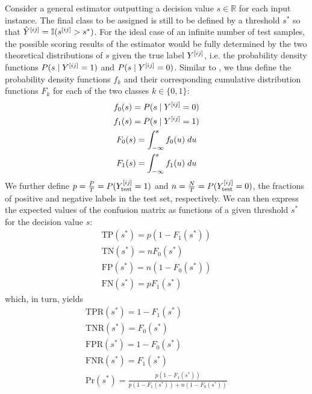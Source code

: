 Consider a general estimator outputting a decision value $s \in \mathbb{R}$ for each input instance. The final class to be assigned is still to be defined by a threshold $s^*$ so that $\hat Y^{[ij]} = \mathbb{I}(s^{[ij]} > s^*)$. For the ideal case of an infinite number of test samples, the possible scoring results of the estimator would be fully determined by the two theoretical distributions of $s$ given the true label $Y^{[ij]}$, i.e. the probability density functions $P(s \mid Y^{[ij]} = 1)$ and $P(s \mid Y^{[ij]} = 0)$. Similar to \textcite{hand2009measuring}, we thus define the probability density functions $f_k$ and their corresponding cumulative distribution functions $F_k$ for each of the two classes $k \in \{0, 1\}$:
%
\begin{gather}
    f_0(s) = P(s \mid Y^{[ij]} = 0) \\
    f_1(s) = P(s \mid Y^{[ij]} = 1) \\
    F_0(s) = \int_{-\infty}^s f_0(u)\;du \\
    F_1(s) = \int_{-\infty}^s f_1(u)\;du
    \label{eq:ideal_confusion_matrix}
\end{gather}
%
We further define $p=\frac{P}{T}=P(Y_\text{test}^{[ij]}=1)$ and $n=\frac{N}{T}=P(Y_\text{test}^{[ij]}=0)$, the fractions of positive and negative labels in the test set, respectively. We can then express the expected values of the confusion matrix as functions of a given threshold $s^*$ for the decision value $s$:
%
\begin{gather}
    \text{TP}(s^*) = p (1 - F_1(s^*)) \\
    \text{TN}(s^*) = n F_0(s^*) \\
    \text{FP}(s^*) = n (1 - F_0(s^*)) \\
    \text{FN}(s^*) = p F_1(s^*)
\end{gather}
%
which, in turn, yields
%
\begin{gather}
    \text{TPR}(s^*) = 1 - F_1(s^*) \\
    \text{TNR}(s^*) = F_0(s^*) \\
    \text{FPR}(s^*) = 1 - F_0(s^*) \\
    \text{FNR}(s^*) = F_1(s^*) \\
    \text{Pr}(s^*) = \frac{p (1 - F_1(s^*))}{p (1 - F_1(s^*)) + n (1 - F_0(s^*))}
\end{gather}

